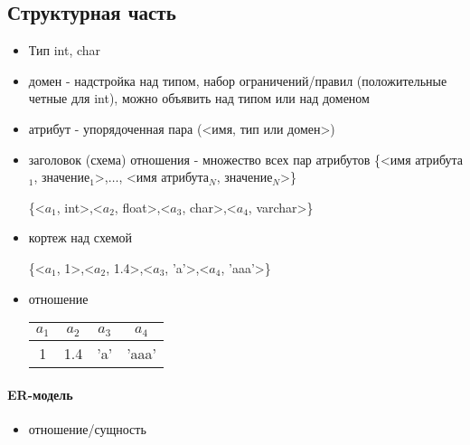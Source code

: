 \documentclass[a4paper, 14pt]{report}
\begin{document}
    \subsection{Структурная часть}

    \begin{itemize}
        \item Тип int, char
        \item домен - надстройка над типом, набор ограничений/правил (положительные четные для int), можно объявить над типом или над доменом
        \item атрибут - упорядоченная пара (<имя, тип или домен>)
        \item заголовок (схема) отношения - множество всех пар атрибутов \{<имя атрибута$_1$, значение$_1$>,$\dots$, <имя атрибута$_N$, значение$_N$>\}

            \{<$a_1$, int>,<$a_2$, float>,<$a_3$, char>,<$a_4$, varchar>\}
        \item кортеж над схемой

            \{<$a_1$, 1>,<$a_2$, 1.4>,<$a_3$, 'a'>,<$a_4$, 'aaa'>\}
        \item отношение

            \begin{tabular}{|c|c|c|c|}
                \hline
                $a_1$ & $a_2$ & $a_3$ & $a_4$ \\
                \hline
                1 & 1.4 & 'a' & 'aaa' \\
                \hline
            \end{tabular}
    \end{itemize}


    \paragraph{ER-модель}

    \begin{itemize}
        \item отношение/сущность

    \end{itemize}
\end{document}
